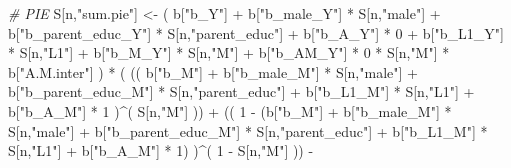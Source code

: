 \documentclass[
]{book}
\newenvironment{Shaded}{\begin{snugshade}}{\end{snugshade}}
\newcommand{\CommentTok}[1]{\textcolor[rgb]{0.56,0.35,0.01}{\textit{#1}}}
\newcommand{\DecValTok}[1]{\textcolor[rgb]{0.00,0.00,0.81}{#1}}
\newcommand{\NormalTok}[1]{#1}
\newcommand{\OtherTok}[1]{\textcolor[rgb]{0.56,0.35,0.01}{#1}}
\newcommand{\SpecialCharTok}[1]{\textcolor[rgb]{0.00,0.00,0.00}{#1}}
\newcommand{\StringTok}[1]{\textcolor[rgb]{0.31,0.60,0.02}{#1}}
\begin{document}
\begin{Shaded}
\begin{Highlighting}[]
    \CommentTok{\# PIE }
\NormalTok{    S[n,}\StringTok{"sum.pie"}\NormalTok{] }\OtherTok{\textless{}{-}}\NormalTok{ ( b[}\StringTok{"b\_Y"}\NormalTok{] }\SpecialCharTok{+} 
\NormalTok{                          b[}\StringTok{"b\_male\_Y"}\NormalTok{] }\SpecialCharTok{*}\NormalTok{ S[n,}\StringTok{"male"}\NormalTok{] }\SpecialCharTok{+} 
\NormalTok{                          b[}\StringTok{"b\_parent\_educ\_Y"}\NormalTok{] }\SpecialCharTok{*}\NormalTok{ S[n,}\StringTok{"parent\_educ"}\NormalTok{] }\SpecialCharTok{+} 
\NormalTok{                          b[}\StringTok{"b\_A\_Y"}\NormalTok{] }\SpecialCharTok{*} \DecValTok{0} \SpecialCharTok{+} 
\NormalTok{                          b[}\StringTok{"b\_L1\_Y"}\NormalTok{] }\SpecialCharTok{*}\NormalTok{ S[n,}\StringTok{"L1"}\NormalTok{] }\SpecialCharTok{+}
\NormalTok{                          b[}\StringTok{"b\_M\_Y"}\NormalTok{] }\SpecialCharTok{*}\NormalTok{ S[n,}\StringTok{"M"}\NormalTok{] }\SpecialCharTok{+}
\NormalTok{                          b[}\StringTok{"b\_AM\_Y"}\NormalTok{] }\SpecialCharTok{*} \DecValTok{0} \SpecialCharTok{*}\NormalTok{ S[n,}\StringTok{"M"}\NormalTok{] }\SpecialCharTok{*}\NormalTok{ b[}\StringTok{"A.M.inter"}\NormalTok{] ) }\SpecialCharTok{*}
\NormalTok{      ( (( b[}\StringTok{"b\_M"}\NormalTok{] }\SpecialCharTok{+} 
\NormalTok{             b[}\StringTok{"b\_male\_M"}\NormalTok{] }\SpecialCharTok{*}\NormalTok{ S[n,}\StringTok{"male"}\NormalTok{] }\SpecialCharTok{+} 
\NormalTok{             b[}\StringTok{"b\_parent\_educ\_M"}\NormalTok{] }\SpecialCharTok{*}\NormalTok{ S[n,}\StringTok{"parent\_educ"}\NormalTok{] }\SpecialCharTok{+} 
\NormalTok{             b[}\StringTok{"b\_L1\_M"}\NormalTok{] }\SpecialCharTok{*}\NormalTok{ S[n,}\StringTok{"L1"}\NormalTok{] }\SpecialCharTok{+}
\NormalTok{             b[}\StringTok{"b\_A\_M"}\NormalTok{] }\SpecialCharTok{*} \DecValTok{1}\NormalTok{ )}\SpecialCharTok{\^{}}\NormalTok{( S[n,}\StringTok{"M"}\NormalTok{] )) }\SpecialCharTok{+}
\NormalTok{          (( }\DecValTok{1} \SpecialCharTok{{-}}\NormalTok{ (b[}\StringTok{"b\_M"}\NormalTok{] }\SpecialCharTok{+} 
\NormalTok{                    b[}\StringTok{"b\_male\_M"}\NormalTok{] }\SpecialCharTok{*}\NormalTok{ S[n,}\StringTok{"male"}\NormalTok{] }\SpecialCharTok{+} 
\NormalTok{                    b[}\StringTok{"b\_parent\_educ\_M"}\NormalTok{] }\SpecialCharTok{*}\NormalTok{ S[n,}\StringTok{"parent\_educ"}\NormalTok{] }\SpecialCharTok{+} 
\NormalTok{                    b[}\StringTok{"b\_L1\_M"}\NormalTok{] }\SpecialCharTok{*}\NormalTok{ S[n,}\StringTok{"L1"}\NormalTok{] }\SpecialCharTok{+}
\NormalTok{                    b[}\StringTok{"b\_A\_M"}\NormalTok{] }\SpecialCharTok{*} \DecValTok{1}\NormalTok{) )}\SpecialCharTok{\^{}}\NormalTok{( }\DecValTok{1} \SpecialCharTok{{-}}\NormalTok{ S[n,}\StringTok{"M"}\NormalTok{] )) }\SpecialCharTok{{-}}

\end{Highlighting}
\end{Shaded}
\end{document}
